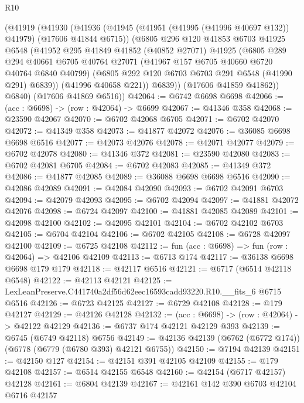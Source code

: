 \begin{lexlean}{R10}
\begin{coremodule}
      (@41919
        (@41930
          (@41936
            (@41945 (@41951 (@41995 (@41996 @40697 @132)) @41979) (@17606 @41844 @6715))
            (@6805
              @296
              @120
              @41853
              @6703
              @41925
              @6548
              (@41952
                @295
                @41849
                @41852
                (@40852 @27071)
                @41925
                (@6805
                  @289
                  @294
                  @40661
                  @6705
                  @40764
                  @27071
                  (@41967 @157 @6705 @40660 @6720 @40764 @6840 @40799)
                  (@6805 @292 @120 @6703 @6703 @291 @6548 (@41990 @291) @6839))
                (@41996 @40658 @221))
              @6839))
          (@17606 @41859 @41862))
        @6840)
      (@17606 @41869 @6516))
@42064 := @6742 @6698 @6698
@42066 := (acc : @6698) -> (row : @42064) -> @6699
@42067 := @41346 @358
@42068 := @23590 @42067
@42070 := @6702 @42068 @6705
@42071 := @6702 @42070
@42072 := @41349 @358
@42073 := @41877 @42072
@42076 := @36085 @6698 @6698 @6516
@42077 := @42073 @42076
@42078 := @42071 @42077
@42079 := @6702 @42078
@42080 := @41346 @372
@42081 := @23590 @42080
@42083 := @6702 @42081 @6705
@42084 := @6702 @42083
@42085 := @41349 @372
@42086 := @41877 @42085
@42089 := @36088 @6698 @6698 @6516
@42090 := @42086 @42089
@42091 := @42084 @42090
@42093 := @6702 @42091 @6703
@42094 := @42079 @42093
@42095 := @6702 @42094
@42097 := @41881 @42072 @42076
@42098 := @6724 @42097
@42100 := @41881 @42085 @42089
@42101 := @42098 @42100
@42102 := @42095 @42101
@42104 := @6702 @42102 @6703
@42105 := @6704 @42104
@42106 := @6702 @42105
@42108 := @6728 @42097 @42100
@42109 := @6725 @42108
@42112 := fun (acc : @6698) => fun (row : @42064) => @42106 @42109
@42113 := @6713 @174
@42117 := @36138 @6698 @6698 @179 @179
@42118 := @42117 @6516
@42121 := @6717 (@6514 @42118 @6548)
@42122 := @42113 @42121
@42125 := LexLeanPreserve.C441740a2df56d62eec16593cadd93220.R10.__fits_6 @6715 @6516
@42126 := @6723 @42125
@42127 := @6729 @42108
@42128 := @179 @42127
@42129 := @42126 @42128
@42132 := (acc : @6698) -> (row : @42064) -> @42122 @42129
@42136 := @6737 @174 @42121 @42129 @393
@42139 := @6745 (@6749 @42118) @6756
@42149 := @42136 @42139 (@6762 (@6772 @174)) (@6778 (@6779 (@6780 @393) @42121 @6755))
@42150 := @7194 @42139
@42151 := @42150 @127
@42154 := @42151 @391 @42105 @42109
@42155 := @179 @42108
@42157 := @6514 @42155 @6548
@42160 := @42154 (@6717 @42157) @42128
@42161 := @6804 @42139
@42167 := @42161 @142 @390 @6703 @42104 @6716 @42157

\end{coremodule}
\end{lexlean}

